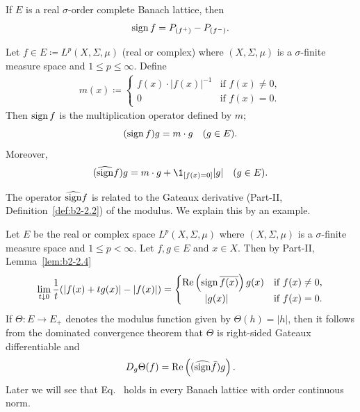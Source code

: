 If\/ $E$ is a real $\sigma$-order complete Banach lattice, then
\begin{equation}\label{eq:c2-2.5}
	\operatorname{sign} f = P_{(f^{+})} - P_{(f^{-})}.
\end{equation}
\begin{example}\label{ex:c2-2.2}
%
Let $f \in E \coloneq L^p(X,\Sigma,\mu)$ (real or complex) where $(X,\Sigma,\mu)$ is a $\sigma$-finite measure space and $1 \leq p \leq \infty$.
Define  
\begin{align*}
	m(x) \coloneq 
	\begin{cases}
        f(x)\cdot|f(x)|^{-1} & \text{if }  f(x)   \neq 0  , \\ 
    	0 & \text{if } f(x) = 0  .
	\end{cases}
\end{align*}
Then $\operatorname{sign} f$ is the multiplication operator defined by $m$; \ie
\[
	(\operatorname{sign} f)g = m \cdot g \quad (g \in E). 
\]
Moreover, 
\[
	(\widehat{\sign} f)g = m \cdot g + \1_{[f(x)=0]}|g| \quad (g \in E).
\]
\end{example}
The operator $\widehat{\operatorname{sign}} f$ is related to the Gateaux derivative (Part-II, Definition~\ref{def:b2-2.2}) of the modulus.
We explain this by an example.
\begin{example}\label{ex:c2-2.3}
%
Let $E$ be the real or complex space $L^p(X,\Sigma,\mu)$ where $(X,\Sigma,\mu)$ is a $\sigma$-finite measure space and $1 \leq p < \infty$.
Let $f,g \in E$ and $x \in X$.
Then by Part-II, Lemma~\ref{lem:b2-2.4}
\begin{align*}
\lim_{t \downarrow 0} \frac{1}{t} (|f(x)+tg(x)|-|f(x)|) = 
\begin{cases}
    \mathop{}\!\mathrm{Re} \left(\operatorname{sign} \overline{f(x)}\right)g(x) & \text{if } f(x) \neq 0  , \\
    \ \quad\quad|g(x)| & \text{if } f(x) = 0  .
\end{cases}
\end{align*}
If\/ $\Theta \colon E \to E_{+}$ denotes the modulus function given by $\Theta(h) = |h|$, then it follows from the dominated convergence theorem that $\Theta$ is right-sided Gateaux differentiable and
\begin{equation}\label{eq:c2-2.6}
D_{g}\Theta(f) = \mathop{}\!\mathrm{Re}\left((\widehat{\operatorname{sign}} \bar{f})g\right).
\end{equation}
Later we will see that Eq.~   holds in every Banach lattice with order continuous norm.
\end{example}
